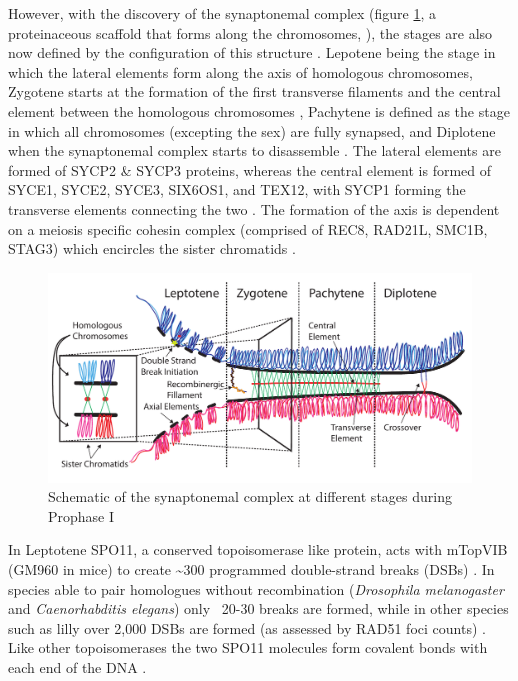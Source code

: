 However, with the discovery of the synaptonemal complex (figure \ref{fig:synaptonemal_complex}, a proteinaceous scaffold that forms along the chromosomes, \cite{Moses1956Chromosomal, Fawcett1956FINE}), the stages are also now defined by the configuration of this structure \parencite{Zickler2015Recombination}. Lepotene being the stage in which the lateral elements form along the axis of homologous chromosomes, Zygotene starts at the formation of the first transverse filaments and the central element between the homologous chromosomes \parencite{Moens1968structure}, Pachytene is defined as the stage in which all chromosomes (excepting the sex) are fully synapsed, and Diplotene when the synaptonemal complex starts to disassemble \parencite{Moses1958Relation, Moses1977Synaptonemal}. The lateral elements are formed of SYCP2 \& SYCP3 proteins, whereas the central element is formed of SYCE1, SYCE2, SYCE3, SIX6OS1, and TEX12, with SYCP1 forming the transverse elements connecting the two \parencite[reviewed in][]{Zickler2015Recombination, Gao2018Zipping, Kaniecki2018change, Dunce2018Structural}. The formation of the axis is dependent on a meiosis specific cohesin complex (comprised of REC8, RAD21L, SMC1B, STAG3) which encircles the sister chromatids \parencite[reviewed in][]{Rankin2015Complex, Ishiguro2019cohesin}.

\begin{figure}[H]
	\centering
	\includegraphics[width=\textwidth]{figures/intro/synaptonemal_complex.pdf}
	\caption[Synaptonemal Complex]{Schematic of the synaptonemal complex at different stages during Prophase I~\parencite[Reproduced from ][ CC BY 0 Licence]{Gaysinskaya2018MOESM1, Gaysinskaya2018Transient}}
	\label{fig:synaptonemal_complex}
\end{figure}

In Leptotene SPO11, a conserved topoisomerase like protein, acts with mTopVIB (GM960 in mice) to create \textasciitilde300 programmed double-strand breaks (DSBs) \parencite{Sun1989Doublestrand, Keeney1997MeiosisSpecific, Bergerat1997atypical, Cole2012Homeostatic, Vrielynck2016DNA, Robert2016TopoVIBLike, Li2019highresolution}. In species able to pair homologues without recombination (\textit{Drosophila melanogaster} and \textit{Caenorhabditis elegans}) only ~20-30 breaks are formed, while in other species such as lilly over 2,000 DSBs are formed (as assessed by RAD51 foci counts) \parencite{Terasawa1995Localization}. Like other topoisomerases the two SPO11 molecules form covalent bonds with each end of the DNA \parencite{Neale2005Endonucleolytic}.

